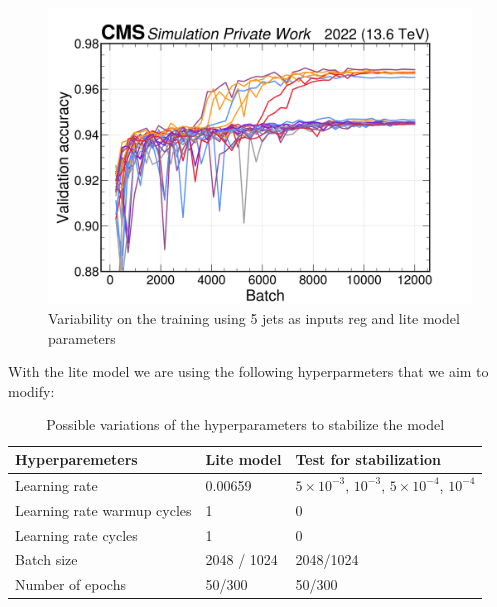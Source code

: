 \begin{figure}[hbt]
    \centering
    \includegraphics[scale=0.1]{Images/6.Improving/Variability Study/5 jets variability study.png}
    \caption{Variability on the training using 5 jets as inputs \pt reg and lite model parameters}
    \label{fig: 5j variability}
\end{figure}

With the lite model we are using the following hyperparmeters that we aim to modify:

\begin{table}[hbt]
\centering
\begin{tabular}{|p{5cm}|p{4cm}|p{5cm}|}
 \hline
 Hyperparemeters  & Lite model & Test for stabilization \\
 \hline
 Learning rate & 0.00659 & $5\times 10^{-3}$, $10^{-3}$, $5\times 10^{-4}$, $10^{-4}$ \\
 \hline
 Learning rate warmup cycles & 1 & 0\\
 \hline
  Learning rate cycles & 1 & 0\\
 \hline
 Batch size & 2048 / 1024 & 2048/1024 \\
 \hline
 Number of epochs & 50/300 & 50/300 \\
 \hline
\end{tabular}
\caption{Possible variations of the hyperparameters to stabilize the model}
\label{table: }
\end{table}

